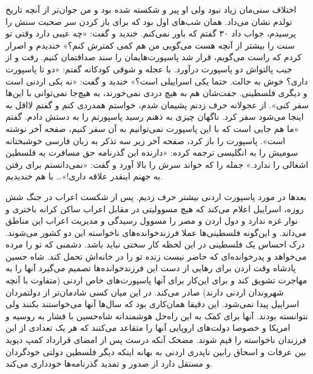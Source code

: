 \documentclass[letterpaper,12pt]{article}
\begin{document}
اختلاف سنی‌مان زیاد نبود ولی او پیر و شکسته شده بود و من جوان‌تر از آنچه تاریخ تولدم نشان‌ می‌داد. همان شب‌های اول بود که برای باز کردن سر صحبت سنش را پرسیدم، جواب داد ۳۰ گفتم که باور نمی‌کنم. خندید و گفت: «چه عیبی دارد وقتی تو سنت را بیشتر از آنچه هست می‌گویی من هم کمی کمترش کنم؟» خندیدم و اصرار کردم که راست می‌گویم، قرار شد پاسپورت‌هایمان را سند صداقتمان کنیم. رفت و از جیب پالتو‌اش دو پاسپورت درآورد. با عجله‌ و شوقی کودکانه گفتم: «دو تا پاسپورت داری؟ خوش به حالت. حتما یکی اسراییلی است؟» خندید و گفت: «نه یکی اردنی است و دیگری فلسطینی. جفت‌شان هم به هیچ دردی نمی‌خورند، به هیچ‌جا نمی‌توانی با این‌ها سفر کنی». از عجولانه حرف زدنم پشیمان شدم، خواستم همدردی کنم و گفتم لااقل به اینجا می‌شود سفر کرد. ناگهان چیزی به ذهنم رسید پاسپورتم را به دستش دادم. گفتم «ما هم جایی است که با این پاسپورت نمی‌توانیم به آن سفر کنیم، صفحه آخر نوشته است». پاسپورت را باز کرد، صفحه آخر زیر سه تذکر به زبان فارسی خوشبختانه سومیش را به انگلیسی ترجمه کرده:‌‌ «دارنده این گذرنامه حق مسافرت به فلسطین اشغالی را ندارد.» جمله را که خواند سرش را بالا آورد و گفت: «نمی‌دانستم برای رفتن به جهنم اینقدر علاقه داری!»… با هم خندیدیم.

بعدها در مورد پاسپورت اردنی بیشتر حرف زدیم. پس از شکست اعراب در جنگ شش روزه، اسراییل اعلام می‌کند که هیچ‌ مسوولیتی در مقابل اعراب ساکن کرانه باختری و نوار غزه ندارد و دول اردن و مصر را مسوول رسیدگی و مدیریت اعراب این مناطق می‌داند. و این‌گونه فلسطینی‌ها عملا فرزند‌خوانده‌های ناخواسته این دو کشور می‌شوند. درک احساس یک فلسطینی در این لحظه کار سختی نباید باشد. دشمنی که تو را مرده می‌خواهد و پدرخوانده‌ای که حاضر نیست زنده تو را در خانه‌اش تحمل کند. شاه حسین پادشاه وقت اردن برای رهایی از دست این فرزند‌خوانده‌ها تصمیم می‌گیرد آنها را به مهاجرت تشویق کند و برای این‌کار برای‌ آنها پاسپورت‌های خاص اردنی (متفاوت با آنچه شهروندان اردنی دارند) صادر می‌کند. در این میان کسی شادمان‌تر از دولتمردان اسراییل پیدا نمی‌شود. این دقیقا هما‌ن‌کاری بود که سال‌ها آنها ‌می‌خواستند بکنند ولی نتوانسته بودند. آنها برای کمک به این راه‌حل هوشمندانه شاه‌حسین با فشار به روسیه و امریکا و خصوصا دولت‌های اروپایی آنها را متقاعد می‌کنند که هر یک تعدادی از این فرزندان ناخواسته را قیم شوند. مضحک آنکه درست پس از امضای قرارداد کمپ دیوید بین عرفات و اسحاق رابین ناپدری اردنی به بهانه اینکه دیگر فلسطین دولتی خود‌گردان و مستقل دارد از صدور و تمدید گذر‌نامه‌ها خود‌داری می‌کند.
\end{document}
